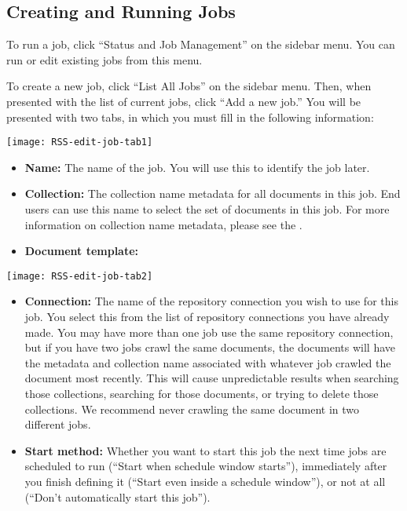 \begin{changemargin}{1.5in}{0in}


\subsection{Creating and Running Jobs}

To run a job, click ``Status and Job Management'' on the sidebar menu.
You can run or edit existing jobs from this menu.

To create a new job, click ``List All Jobs'' on the sidebar menu. Then, when
presented with the list of current jobs, click ``Add a new job.'' You
will be presented with two tabs, in which you must fill in the following
information:

\texttt{[image: RSS-edit-job-tab1]}

\begin{itemize}

\item \textbf{Name:} The name of the job. You will use this to identify
the job later.

\item \textbf{Collection:} The collection name metadata for all
documents in this job. End users can use this name to select the set
of documents in this job. For more information on collection name
metadata, please see the .

\item \textbf{Document template:} 

\end{itemize}

\texttt{[image: RSS-edit-job-tab2]}

\begin{itemize}

\item \textbf{Connection:} The name of the repository connection you
wish to use for this job. You select this from the list of repository
connections you have already made. You may have more than one job use
the same repository connection, but if you have two jobs crawl the same
documents, the documents will have the metadata and collection name
associated with whatever job crawled the document most recently. This
will cause unpredictable results when searching those collections,
searching for those documents, or trying to delete those collections.
We recommend never crawling the same document in two different jobs.

\item \textbf{Start method:} Whether you want to start this job the next
time jobs are scheduled to run (``Start when schedule window starts''),
immediately after you finish defining it (``Start even inside a schedule
window''), or not at all (``Don't automatically start this job'').


\end{itemize}
\end{changemargin}
